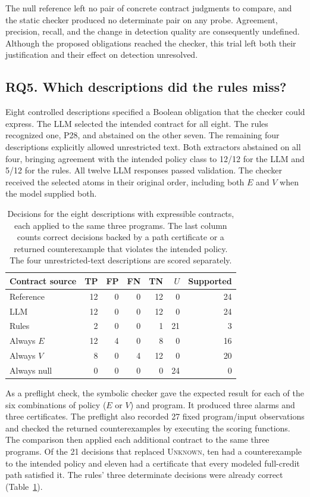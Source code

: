 \documentclass[sigconf]{acmart}
\newcommand{\Unknown}{\textsc{Unknown}}
\begin{document}
The null reference left no pair of concrete contract judgments to compare, and the static checker produced no determinate pair on any probe. Agreement, precision, recall, and the change in detection quality are consequently undefined. Although the proposed obligations reached the checker, this trial left both their justification and their effect on detection unresolved.


\subsection{RQ5. Which descriptions did the rules miss?}

Eight controlled descriptions specified a Boolean obligation that the checker could express. The LLM selected the intended contract for all eight. The rules recognized one, P28, and abstained on the other seven. The remaining four descriptions explicitly allowed unrestricted text. Both extractors abstained on all four, bringing agreement with the intended policy class to 12/12 for the LLM and 5/12 for the rules. All twelve LLM responses passed validation. The checker received the selected atoms in their original order, including both $E$ and $V$ when the model supplied both.

\begin{table}[t]
\caption{Decisions for the eight descriptions with expressible contracts, each applied to the same three programs. The last column counts correct decisions backed by a path certificate or a returned counterexample that violates the intended policy. The four unrestricted-text descriptions are scored separately.}
\label{tab:controlled}
\centering\small
\begin{tabular}{@{}lrrrrrr@{}}
\toprule
Contract source & TP & FP & FN & TN & $U$ & Supported\\
\midrule
Reference &12&0&0&12&0&24\\
LLM &12&0&0&12&0&24\\
Rules &2&0&0&1&21&3\\
Always $E$ &12&4&0&8&0&16\\
Always $V$ &8&0&4&12&0&20\\
Always null &0&0&0&0&24&0\\
\bottomrule
\end{tabular}
\end{table}

As a preflight check, the symbolic checker gave the expected result for each of the six combinations of policy ($E$ or $V$) and program. It produced three alarms and three certificates. The preflight also recorded 27 fixed program/input observations and checked the returned counterexamples by executing the scoring functions. The comparison then applied each additional contract to the same three programs. Of the 21 decisions that replaced \Unknown{}, ten had a counterexample to the intended policy and eleven had a certificate that every modeled full-credit path satisfied it. The rules' three determinate decisions were already correct (Table~\ref{tab:controlled}).
\end{document}

